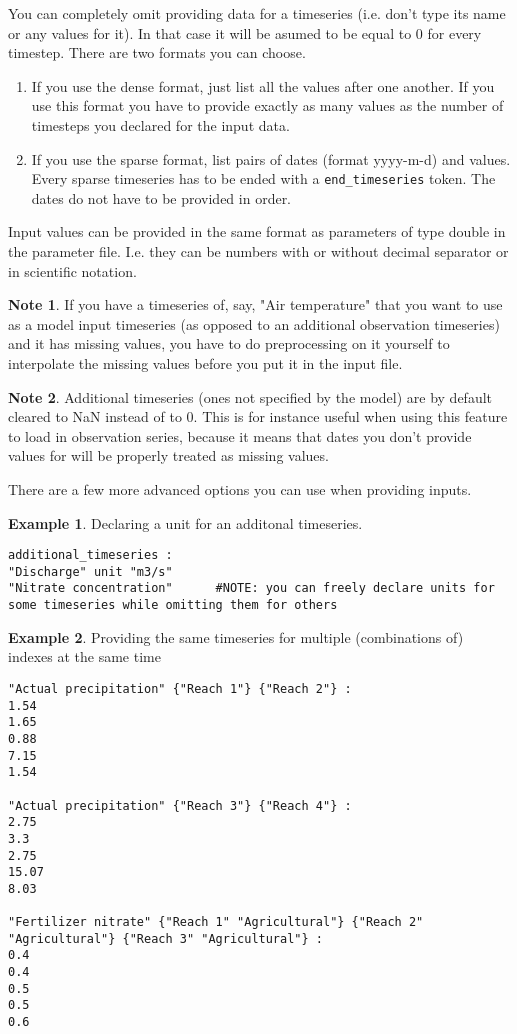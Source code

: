 \documentclass[11pt]{article}
\theoremstyle{definition}
\newtheorem{mynote}{Note}
\newenvironment{note}%
  {\begin{lrbox}{\notebox}%
   \begin{minipage}{\dimexpr\linewidth-2\fboxsep}
   \begin{mynote}}%
  {\end{mynote}%
   \end{minipage}%
   \end{lrbox}%
   \begin{trivlist}
     \item[]\colorbox{silver}{\usebox\notebox}
   \end{trivlist}}
\newtheorem{myexample}{Example}
\newenvironment{example}%
  {\begin{lrbox}{\examplebox}%
   \begin{minipage}{\dimexpr\linewidth-2\fboxsep}
   \begin{myexample}}%
  {\end{myexample}%
   \end{minipage}%
   \end{lrbox}%
   \begin{trivlist}
     \item[]\colorbox{silver}{\usebox\examplebox}
   \end{trivlist}}
\begin{document}
You can completely omit providing data for a timeseries (i.e. don't type its name or any values for it). In that case it will be asumed to be equal to 0 for every timestep. There are two formats you can choose.
\begin{enumerate}[i]
\item If you use the dense format, just list all the values after one another. If you use this format you have to provide exactly as many values as the number of timesteps you declared for the input data.
\item If you use the sparse format, list pairs of dates (format yyyy-m-d) and values. Every sparse timeseries has to be ended with a {\tt end\_timeseries} token. The dates do not have to be provided in order.
\end{enumerate}
Input values can be provided in the same format as parameters of type double in the parameter file. I.e. they can be numbers with or without decimal separator or in scientific notation.

\begin{note}
If you have a timeseries of, say, "Air temperature" that you want to use as a model input timeseries (as opposed to an additional observation timeseries) and it has missing values, you have to do preprocessing on it yourself to interpolate the missing values before you put it in the input file.
\end{note}

\begin{note}
Additional timeseries (ones not specified by the model) are by default cleared to NaN instead of to 0. This is for instance useful when using this feature to load in observation series, because it means that dates you don't provide values for will be properly treated as missing values.
\end{note}

There are a few more advanced options you can use when providing inputs.

\begin{example}\label{ex:declarewithunit}
Declaring a unit for an additonal timeseries.
\begin{lstlisting}
additional_timeseries :
"Discharge" unit "m3/s"
"Nitrate concentration"      #NOTE: you can freely declare units for some timeseries while omitting them for others
\end{lstlisting}
\end{example}

\begin{example}\label{ex:multiseries}
Providing the same timeseries for multiple (combinations of) indexes at the same time
\begin{lstlisting}
"Actual precipitation" {"Reach 1"} {"Reach 2"} :
1.54
1.65
0.88
7.15
1.54

"Actual precipitation" {"Reach 3"} {"Reach 4"} :
2.75
3.3
2.75
15.07
8.03

"Fertilizer nitrate" {"Reach 1" "Agricultural"} {"Reach 2" "Agricultural"} {"Reach 3" "Agricultural"} :
0.4
0.4
0.5
0.5
0.6
\end{lstlisting}
\end{example}
\end{document}
